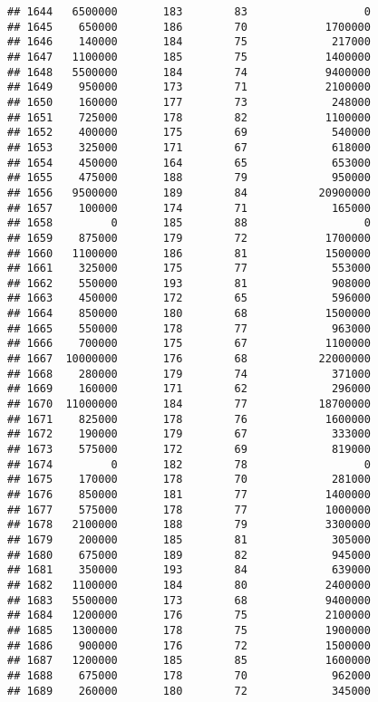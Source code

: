 \documentclass[
]{article}
\begin{document}
\begin{verbatim}
## 1644   6500000       183        83                  0
## 1645    650000       186        70            1700000
## 1646    140000       184        75             217000
## 1647   1100000       185        75            1400000
## 1648   5500000       184        74            9400000
## 1649    950000       173        71            2100000
## 1650    160000       177        73             248000
## 1651    725000       178        82            1100000
## 1652    400000       175        69             540000
## 1653    325000       171        67             618000
## 1654    450000       164        65             653000
## 1655    475000       188        79             950000
## 1656   9500000       189        84           20900000
## 1657    100000       174        71             165000
## 1658         0       185        88                  0
## 1659    875000       179        72            1700000
## 1660   1100000       186        81            1500000
## 1661    325000       175        77             553000
## 1662    550000       193        81             908000
## 1663    450000       172        65             596000
## 1664    850000       180        68            1500000
## 1665    550000       178        77             963000
## 1666    700000       175        67            1100000
## 1667  10000000       176        68           22000000
## 1668    280000       179        74             371000
## 1669    160000       171        62             296000
## 1670  11000000       184        77           18700000
## 1671    825000       178        76            1600000
## 1672    190000       179        67             333000
## 1673    575000       172        69             819000
## 1674         0       182        78                  0
## 1675    170000       178        70             281000
## 1676    850000       181        77            1400000
## 1677    575000       178        77            1000000
## 1678   2100000       188        79            3300000
## 1679    200000       185        81             305000
## 1680    675000       189        82             945000
## 1681    350000       193        84             639000
## 1682   1100000       184        80            2400000
## 1683   5500000       173        68            9400000
## 1684   1200000       176        75            2100000
## 1685   1300000       178        75            1900000
## 1686    900000       176        72            1500000
## 1687   1200000       185        85            1600000
## 1688    675000       178        70             962000
## 1689    260000       180        72             345000

\end{verbatim}
\end{document}
